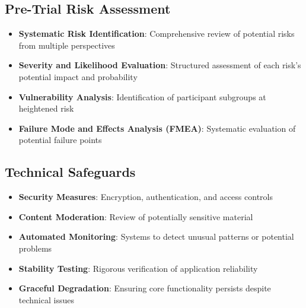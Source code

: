 \subsection{Pre-Trial Risk Assessment}
\begin{itemize}
    \item \textbf{Systematic Risk Identification}: Comprehensive review of potential risks from multiple perspectives
    
    \item \textbf{Severity and Likelihood Evaluation}: Structured assessment of each risk's potential impact and probability
    
    \item \textbf{Vulnerability Analysis}: Identification of participant subgroups at heightened risk
    
    \item \textbf{Failure Mode and Effects Analysis (FMEA)}: Systematic evaluation of potential failure points
\end{itemize}

\subsection{Technical Safeguards}
\begin{itemize}
    \item \textbf{Security Measures}: Encryption, authentication, and access controls
    
    \item \textbf{Content Moderation}: Review of potentially sensitive material
    
    \item \textbf{Automated Monitoring}: Systems to detect unusual patterns or potential problems
    
    \item \textbf{Stability Testing}: Rigorous verification of application reliability
    
    \item \textbf{Graceful Degradation}: Ensuring core functionality persists despite technical issues
\end{itemize}

